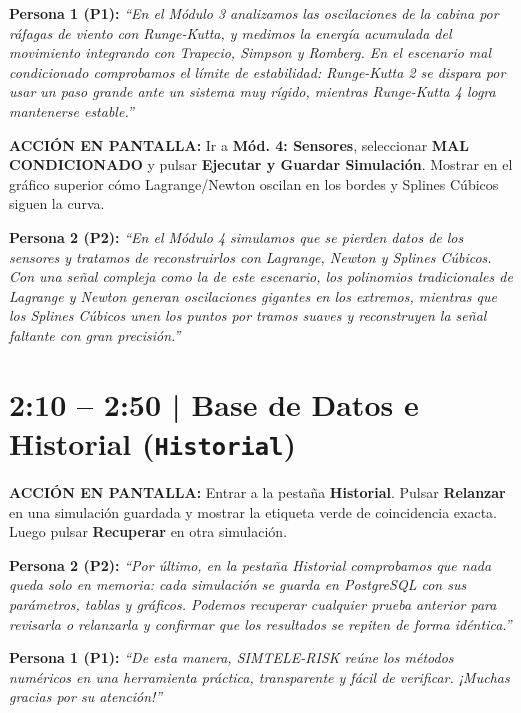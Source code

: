 \documentclass[11pt,a4paper]{article}
\newcommand{\accion}[1]{%
\begin{tcolorbox}[colback=accionbg,colframe=accionborder,boxrule=0.6pt,arc=2pt,left=6pt,right=6pt,top=4pt,bottom=4pt]
\small\textbf{ACCIÓN EN PANTALLA:} #1
\end{tcolorbox}
}
\newcommand{\puno}[1]{\noindent\textcolor{p1color}{\textbf{Persona 1 (P1):}} \textit{``#1''}\par\medskip}
\newcommand{\pdos}[1]{\noindent\textcolor{p2color}{\textbf{Persona 2 (P2):}} \textit{``#1''}\par\medskip}
\begin{document}
\puno{En el Módulo 3 analizamos las oscilaciones de la cabina por ráfagas de viento con Runge-Kutta, y medimos la energía acumulada del movimiento integrando con Trapecio, Simpson y Romberg. En el escenario mal condicionado comprobamos el límite de estabilidad: Runge-Kutta 2 se dispara por usar un paso grande ante un sistema muy rígido, mientras Runge-Kutta 4 logra mantenerse estable.}

\accion{Ir a \textbf{Mód. 4: Sensores}, seleccionar \textbf{MAL CONDICIONADO} y pulsar \textbf{Ejecutar y Guardar Simulación}. Mostrar en el gráfico superior cómo Lagrange/Newton oscilan en los bordes y Splines Cúbicos siguen la curva.}

\pdos{En el Módulo 4 simulamos que se pierden datos de los sensores y tratamos de reconstruirlos con Lagrange, Newton y Splines Cúbicos. Con una señal compleja como la de este escenario, los polinomios tradicionales de Lagrange y Newton generan oscilaciones gigantes en los extremos, mientras que los Splines Cúbicos unen los puntos por tramos suaves y reconstruyen la señal faltante con gran precisión.}

\section{2:10 -- 2:50 | Base de Datos e Historial (\texttt{Historial})}
\accion{Entrar a la pestaña \textbf{Historial}. Pulsar \textbf{Relanzar} en una simulación guardada y mostrar la etiqueta verde de coincidencia exacta. Luego pulsar \textbf{Recuperar} en otra simulación.}

\pdos{Por último, en la pestaña Historial comprobamos que nada queda solo en memoria: cada simulación se guarda en PostgreSQL con sus parámetros, tablas y gráficos. Podemos recuperar cualquier prueba anterior para revisarla o relanzarla y confirmar que los resultados se repiten de forma idéntica.}

\puno{De esta manera, SIMTELE-RISK reúne los métodos numéricos en una herramienta práctica, transparente y fácil de verificar. ¡Muchas gracias por su atención!}
\end{document}
